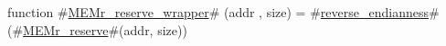 function #\hyperref[zMEMrzyreservezywrapper]{MEMr\_reserve\_wrapper}# (addr , size) =
    #\hyperref[zreversezyendianness]{reverse\_endianness}#(#\hyperref[zMEMrzyreserve]{MEMr\_reserve}#(addr, size))
